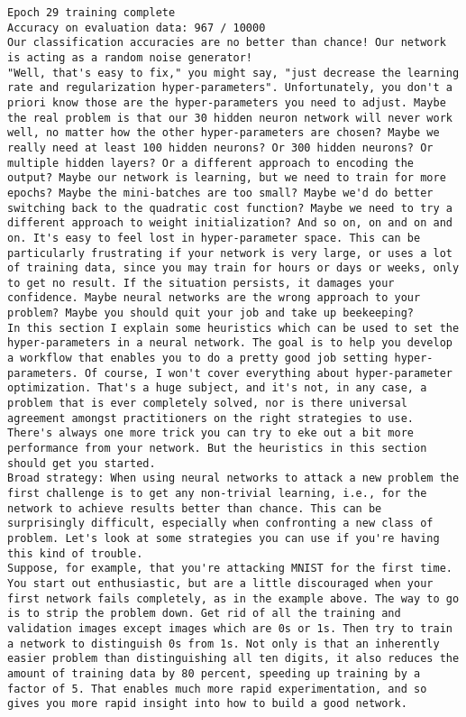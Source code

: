 \begin{lstlisting}
Epoch 29 training complete
Accuracy on evaluation data: 967 / 10000
Our classification accuracies are no better than chance! Our network is acting as a random noise generator!
"Well, that's easy to fix," you might say, "just decrease the learning rate and regularization hyper-parameters". Unfortunately, you don't a priori know those are the hyper-parameters you need to adjust. Maybe the real problem is that our 30 hidden neuron network will never work well, no matter how the other hyper-parameters are chosen? Maybe we really need at least 100 hidden neurons? Or 300 hidden neurons? Or multiple hidden layers? Or a different approach to encoding the output? Maybe our network is learning, but we need to train for more epochs? Maybe the mini-batches are too small? Maybe we'd do better switching back to the quadratic cost function? Maybe we need to try a different approach to weight initialization? And so on, on and on and on. It's easy to feel lost in hyper-parameter space. This can be particularly frustrating if your network is very large, or uses a lot of training data, since you may train for hours or days or weeks, only to get no result. If the situation persists, it damages your confidence. Maybe neural networks are the wrong approach to your problem? Maybe you should quit your job and take up beekeeping?
In this section I explain some heuristics which can be used to set the hyper-parameters in a neural network. The goal is to help you develop a workflow that enables you to do a pretty good job setting hyper-parameters. Of course, I won't cover everything about hyper-parameter optimization. That's a huge subject, and it's not, in any case, a problem that is ever completely solved, nor is there universal agreement amongst practitioners on the right strategies to use. There's always one more trick you can try to eke out a bit more performance from your network. But the heuristics in this section should get you started.
Broad strategy: When using neural networks to attack a new problem the first challenge is to get any non-trivial learning, i.e., for the network to achieve results better than chance. This can be surprisingly difficult, especially when confronting a new class of problem. Let's look at some strategies you can use if you're having this kind of trouble.
Suppose, for example, that you're attacking MNIST for the first time. You start out enthusiastic, but are a little discouraged when your first network fails completely, as in the example above. The way to go is to strip the problem down. Get rid of all the training and validation images except images which are 0s or 1s. Then try to train a network to distinguish 0s from 1s. Not only is that an inherently easier problem than distinguishing all ten digits, it also reduces the amount of training data by 80 percent, speeding up training by a factor of 5. That enables much more rapid experimentation, and so gives you more rapid insight into how to build a good network.

\end{lstlisting}
